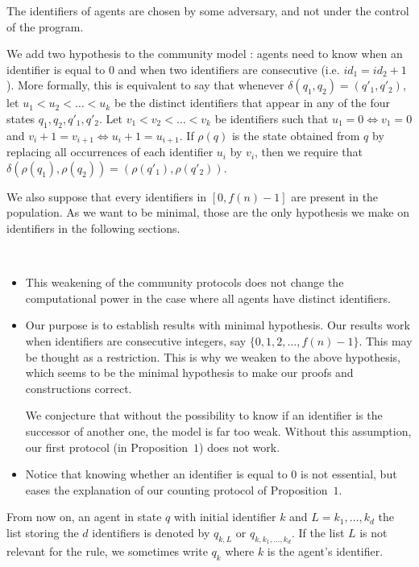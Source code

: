\documentclass[UKenglish]{llncs}
\begin{document}
The identifiers of agents
are chosen by some adversary, and not under the control of the
program. 

We add two hypothesis to the community model \cite{guerraoui2009names}:
agents need to know when an identifier is equal to $0$ and when
two identifiers are consecutive (i.e. $id_1=id_2+1$).
More formally, this is equivalent to say that 
whenever $\delta(q_1,q_2)=(q'_1,q'_2)$, let  $u_1< u_2< \dots< u_k$ 
be the distinct  identifiers that appear in any of
  the four states $q_1,q_2,q'_1,q'_2$.
Let $v_1 < v_2 < \dots < v_k$ be identifiers such that  $u_1=0\Leftrightarrow v_1=0$ and $v_i+1=v_{i+1}\Leftrightarrow u_i+1=u_{i+1}$.
If $\rho(q)$ is the state obtained from $q$ by replacing all
  occurrences of each identifier $u_i$ by $v_i$, then we require that
  $\delta(\rho(q_1),\rho(q_2))=(\rho(q'_1),\rho(q'_2))$. 


 We also suppose that
every identifiers in $[0,f(n)-1]$ are present in the population. As we want to be
minimal,  those are the only hypothesis we make on identifiers in the following
sections. 






\begin{remark} \ 

\vspace{-0.3cm}
\begin{itemize}
\item This weakening of the community protocols does not change the computational
power in the case where all agents have distinct identifiers.
\item 
Our purpose is to establish results with minimal hypothesis. Our
results work  when identifiers are consecutive integers, say
$\{0,1,2,\dots,f(n)-1\}$.  
This may be thought as a restriction. This is why we weaken to the
above hypothesis, which seems to be the minimal hypothesis to make our
proofs and constructions correct. 

We conjecture that without the possibility to know if an identifier is
the successor of another one, the model is far too weak. Without this
assumption, our first protocol (in  Proposition~$1$) does not work.
\item
Notice that 
knowing whether an identifier is equal to $0$ is not essential, but eases
the explanation of our counting protocol of Proposition~$1$.
\end{itemize}
\end{remark}


  From now on, an agent in state $q$ with initial identifier $k$ and
  $L=k_1,\ldots ,k_d$ the list storing the $d$ identifiers is denoted
  by $q_{k,L}$ or $q_{k,k_1,\ldots ,k_d}$.  If the list $L$ is not
  relevant for the rule, we sometimes write $q_k$ where $k$ is the agent's identifier.
\end{document}
